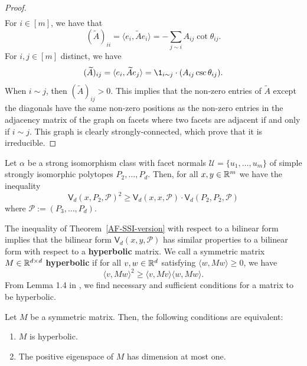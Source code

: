 \documentclass{puthesis-UG}
\begin{document}
\begin{proof}
\begin{align*}
	\end{align*}
	For $i \in [m]$, we have that 
	\[
		(\widetilde{A})_{ii} = \langle e_i, \widetilde{A}e_i \rangle = - \sum_{j \sim i} A_{ij} \cot \theta_{ij}.
	\]
	For $i, j \in [m]$ distinct, we have 
	\[
		(\widetilde{A})_{ij} = \langle e_i, \widetilde{A}e_j \rangle = \1_{i \sim j} \cdot (A_{ij} \csc \theta_{ij}).
	\]
	When $i \sim j$, then $(\widetilde{A})_{ij} > 0$. This implies that the non-zero entries of $\widetilde{A}$ except the diagonals have the same non-zero positions as the non-zero entries in the adjacency matrix of the graph on facets where two facets are adjacent if and only if $i \sim j$. This graph is clearly strongly-connected, which prove that it is irreducible. 
\end{proof}

\begin{thm} \label{AF-SSI-version}
	Let $\alpha$ be a strong isomorphism class with facet normals $\mathcal{U} = \{u_1, \ldots, u_m\}$ of simple strongly isomorphic polytopes $P_2, \ldots, P_d$. Then, for all $x, y \in \mathbb{R}^m$ we have the inequality
	\[
		\mathsf{V}_d (x, P_2, \mathcal{P})^2 \geq \mathsf{V}_d (x, x, \mathcal{P}) \cdot \mathsf{V}_d (P_2, P_2, \mathcal{P})
	\]
	where $\mathcal{P} := (P_3, \ldots, P_{d})$.
\end{thm}

The inequality of Theorem~\ref{AF-SSI-version} with respect to a bilinear form implies that the bilinear form $\mathsf{V}_d (x, y, \mathcal{P})$ has similar properties to a bilinear form with respect to a \textbf{hyperbolic} matrix. We call a symmetric matrix $M \in \mathbb{R}^{d \times d}$ \textbf{hyperbolic} if for all $v, w \in \mathbb{R}^d$ satisfying $\langle w, Mw \rangle \geq 0$, we have 
\[
		\langle v, Mw \rangle^2 \geq \langle v, Mv \rangle \langle w, M w \rangle. 
\]
From Lemma 1.4 in \cite{bochner}, we find necessary and sufficient conditions for a matrix to be hyperbolic. 

\begin{lem} \label{hyperbolic-quadratic-forms}
	Let $M$ be a symmetric matrix. Then, the following conditions are equivalent:
	\begin{enumerate}[label = (\alph*)]
		\item $M$ is hyperbolic. 

		\item The positive eigenspace of $M$ has dimension at most one. 
	\end{enumerate}
\end{lem}
\end{document}
